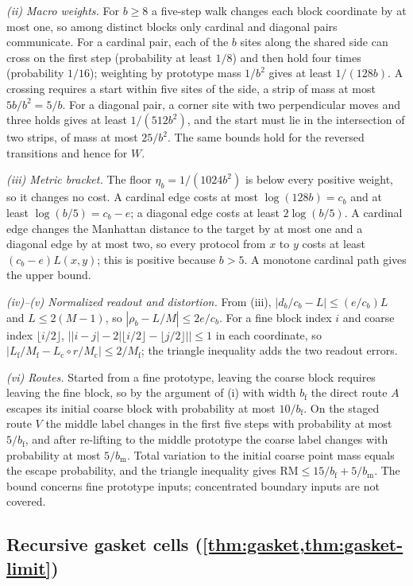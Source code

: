 \documentclass[11pt]{article}
\newcommand{\RM}{\mathrm{RM}}
\begin{document}
\emph{(ii) Macro weights.}
For $b\ge8$ a five-step walk changes each block coordinate by at most one, so among distinct blocks only cardinal and diagonal pairs communicate.
For a cardinal pair, each of the $b$ sites along the shared side can cross on the first step (probability at least $1/8$) and then hold four times (probability $1/16$); weighting by prototype mass $1/b^2$ gives at least $1/(128b)$.
A crossing requires a start within five sites of the side, a strip of mass at most $5b/b^2=5/b$.
For a diagonal pair, a corner site with two perpendicular moves and three holds gives at least $1/(512b^2)$, and the start must lie in the intersection of two strips, of mass at most $25/b^2$.
The same bounds hold for the reversed transitions and hence for $W$.

\emph{(iii) Metric bracket.}
The floor $\eta_b=1/(1024b^2)$ is below every positive weight, so it changes no cost.
A cardinal edge costs at most $\log(128b)=c_b$ and at least $\log(b/5)=c_b-e$; a diagonal edge costs at least $2\log(b/5)$.
A cardinal edge changes the Manhattan distance to the target by at most one and a diagonal edge by at most two, so every protocol from $x$ to $y$ costs at least $(c_b-e)L(x,y)$; this is positive because $b>5$.
A monotone cardinal path gives the upper bound.

\emph{(iv)--(v) Normalized readout and distortion.}
From (iii), $|d_b/c_b-L|\le(e/c_b)L$ and $L\le2(M-1)$, so $|\rho_b-L/M|\le2e/c_b$.
For a fine block index $i$ and coarse index $\lfloor i/2\rfloor$, $\bigl||i-j|-2|\lfloor i/2\rfloor-\lfloor j/2\rfloor|\bigr|\le1$ in each coordinate, so $|L_{\mathrm f}/M_{\mathrm f}-L_{\mathrm c}\circ r/M_{\mathrm c}|\le2/M_{\mathrm f}$; the triangle inequality adds the two readout errors.

\emph{(vi) Routes.}
Started from a fine prototype, leaving the coarse block requires leaving the fine block, so by the argument of (i) with width $b_{\mathrm f}$ the direct route $A$ escapes its initial coarse block with probability at most $10/b_{\mathrm f}$.
On the staged route $V$ the middle label changes in the first five steps with probability at most $5/b_{\mathrm f}$, and after re-lifting to the middle prototype the coarse label changes with probability at most $5/b_{\mathrm m}$.
Total variation to the initial coarse point mass equals the escape probability, and the triangle inequality gives $\RM\le15/b_{\mathrm f}+5/b_{\mathrm m}$.
The bound concerns fine prototype inputs; concentrated boundary inputs are not covered.

\subsection{Recursive gasket cells (\texorpdfstring{\cref{thm:gasket,thm:gasket-limit}}{Theorems 6.2 and 6.3})}
\label{app:gasket-proof}
\end{document}

